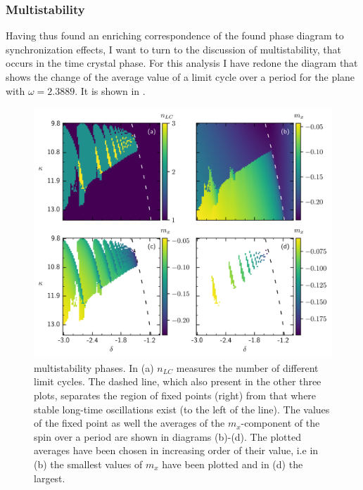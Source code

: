 \subsubsection{Multistability}\label{sec:multistability}
Having thus found an enriching correspondence of the found phase diagram to synchronization effects, I want to turn to the discussion of multistability, that occurs in the time crystal phase. For this analysis I have redone the diagram that shows the change of the average value of a limit cycle over a period for the plane with $\omega=2.3889$. It is shown in .
\begin{figure}[H]
    \hspace*{-1.2cm}
    \includegraphics{pictures/limit_cycle_mean.png}
    \caption{multistability phases. In (a) $n_{LC}$ measures the number of different limit cycles. The dashed line, which also present in the other three plots, separates the region of fixed points (right) from that where stable long-time oscillations exist (to the left of the line). The values of the fixed point as well the averages of the $m_x$-component of the spin over a period are shown in diagrams (b)-(d). The plotted averages have been chosen in increasing order of their value, i.e in (b) the smallest values of $m_x$ have been plotted and in (d) the largest.}
    \label{fig:precise_multistab2d}
\end{figure}
